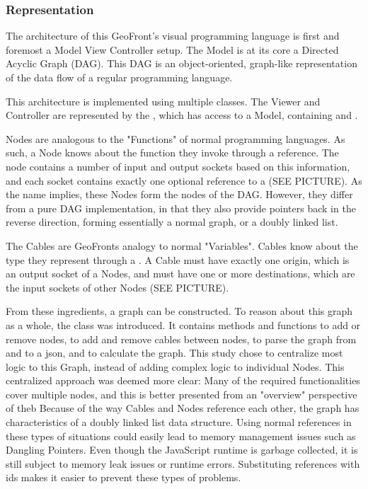 \subsubsection*{ Representation }

The architecture of this GeoFront's visual programming language is first and foremost a Model View Controller setup. The Model 
is at its core a Directed Acyclic Graph (DAG). 
This DAG is an object-oriented, graph-like representation of the data flow of a regular programming language. 

This architecture is implemented using multiple classes. The Viewer and Controller are represented by the , which has access to a  Model, containing  and . 

Nodes are analogous to the "Functions" of normal programming languages. 
As such, a Node knows about the function they invoke through a  reference. 
The node contains a number of input and output sockets based on this information, and each socket contains exactly one optional reference to a  (SEE PICTURE).  
As the name implies, these Nodes form the nodes of the DAG. However, they differ from a pure DAG implementation, in that they also provide pointers back in the reverse direction, forming essentially a normal graph, or a doubly linked list. 

The Cables are GeoFronts analogy to normal "Variables". Cables know about the type they represent through a . A Cable must have exactly one origin, which is an output socket of a Nodes, and must have one or more destinations, which are the input sockets of other Nodes (SEE PICTURE).

From these ingredients, a graph can be constructed. 
To reason about this graph as a whole, the  class was introduced. 
It contains methods and functions to add or remove nodes, to add and remove cables between nodes, to parse the graph from and to a json, and to calculate the graph.  
This study chose to centralize most logic to this Graph, instead of adding complex logic to individual Nodes. 
This centralized approach was deemed more clear: Many of the required functionalities cover multiple nodes, and this is better presented from an "overview" perspective of theb 
Because of the way Cables and Nodes reference each other, the graph has characteristics of a doubly linked list data structure. Using normal references in these types of situations could easily lead to memory management issues such as Dangling Pointers. Even though the JavaScript runtime is garbage collected, it is still subject to memory leak issues or runtime errors. Substituting references with ids makes it easier to prevent these types of problems. 

